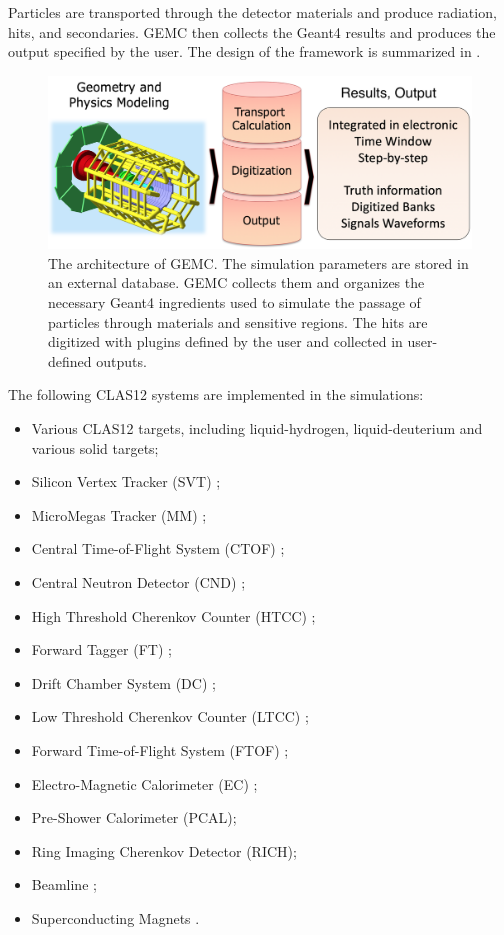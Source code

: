 Particles are transported through the detector materials and produce radiation, hits, and secondaries.
GEMC then collects the Geant4 results and produces the output specified by the user.
The design of the framework is summarized in .

\begin{figure}
	\centering
	\includegraphics[width=1.0\columnwidth,keepaspectratio]{img/gemcDesign.png}
	\caption{The architecture of GEMC. The simulation parameters are stored in an external database. GEMC collects
             them and organizes the necessary Geant4 ingredients used to simulate the
             passage of particles through materials and sensitive regions. The hits are digitized with
             plugins defined by the user and collected in user-defined outputs.  }
	\label{fig:gemcDesign}
\end{figure}

The following CLAS12 systems are implemented in the simulations:

\begin{itemize}
\item Various CLAS12 targets, including liquid-hydrogen, liquid-deuterium and various solid targets;
\item Silicon Vertex Tracker (SVT) \cite{svt-nim};
\item MicroMegas Tracker (MM) \cite{mm-nim};
\item Central Time-of-Flight System (CTOF) \cite{ctof-nim};
\item Central Neutron Detector (CND) \cite{cnd-nim};
\item High Threshold Cherenkov Counter (HTCC) \cite{htcc-nim};
\item Forward Tagger (FT) \cite{ft-nim};
\item Drift Chamber System (DC) \cite{dc-nim};
\item Low Threshold Cherenkov Counter (LTCC) \cite{ltcc-nim};
\item Forward Time-of-Flight System (FTOF) \cite{ftof-nim};
\item Electro-Magnetic Calorimeter (EC) \cite{Amarian:2001zs};
\item Pre-Shower Calorimeter (PCAL)\cite{ec-nim};
\item Ring Imaging Cherenkov Detector (RICH)\cite{rich-nim};
\item Beamline \cite{beamline-nim};
\item Superconducting Magnets \cite{magnets-nim}.
\end{itemize}

